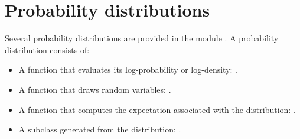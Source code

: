 \documentclass[]{jss}
\begin{document}
\section{Probability distributions} 
\label{chap:distributions}
Several probability distributions are provided in the module . A probability distribution consists of:
\begin{itemize}
    \item A function that evaluates its log-probability or log-density: .
    \item A function that draws random variables: .
    \item A function that computes the expectation associated with the distribution: .
    \item A  subclass generated from the distribution: .
\end{itemize} 




\end{document}
